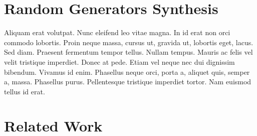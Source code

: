 \documentclass[conference, fleqn]{IEEEtran}
\begin{document}






%   
\section{Random Generators Synthesis} \label{sec:synthesis}

Aliquam erat volutpat. Nunc eleifend leo vitae magna. In id erat non orci
commodo lobortis. Proin neque massa, cursus ut, gravida ut, lobortis eget,
lacus. Sed diam. Praesent fermentum tempor tellus. Nullam tempus. Mauris ac
felis vel velit tristique imperdiet. Donec at pede. Etiam vel neque nec dui
dignissim bibendum. Vivamus id enim. Phasellus neque orci, porta a, aliquet
quis, semper a, massa. Phasellus purus. Pellentesque tristique imperdiet tortor.
Nam euismod tellus id erat.
\section{Related Work}
\end{document}
